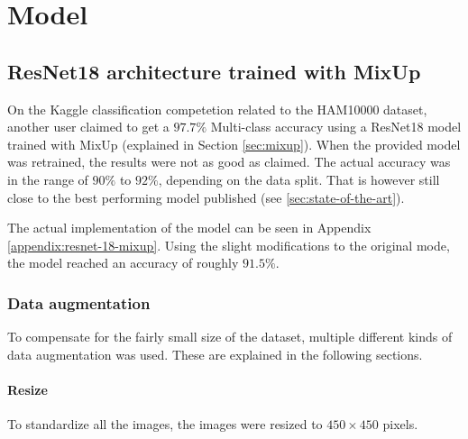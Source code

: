 \chapter{Model}\label{sec:model}
\section{ResNet18 architecture trained with MixUp}
On the Kaggle classification competetion related to the HAM10000 dataset\cite{HAM10000-kaggle-competetion},
another user claimed to get a $97.7\%$ Multi-class accuracy using a ResNet18 model trained with MixUp 
(explained in Section \ref{sec:mixup})\cite{kaggle-97-model}.
When the provided model was retrained,
the results were not as good as claimed.
The actual accuracy was in the range of $90\%$ to $92\%$,
depending on the data split.
That is however still close to the best performing model published (see \ref{sec:state-of-the-art}).

The actual implementation of the model can be seen in Appendix \ref{appendix:resnet-18-mixup}.
Using the slight modifications to the original mode, the model reached an accuracy of roughly $91.5\%$.

\subsection{Data augmentation}
To compensate for the fairly small size of the dataset,
multiple different kinds of data augmentation was used.
These are explained in the following sections.
\subsubsection{Resize}
To standardize all the images, the images were resized to $450\times450$ pixels.

